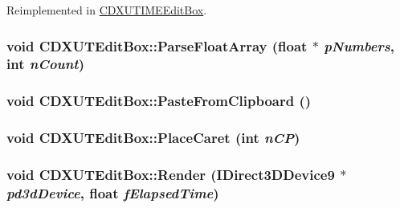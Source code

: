 Reimplemented in \hyperlink{class_c_d_x_u_t_i_m_e_edit_box_a6f3ada4a18eb810420806d5112fd7de6}{CDXUTIMEEditBox}.\hypertarget{class_c_d_x_u_t_edit_box_a7a3810c8c3ee8f44a87451fd0d3ce127}{
\subsubsection[{ParseFloatArray}]{\setlength{\rightskip}{0pt plus 5cm}void CDXUTEditBox::ParseFloatArray (float $\ast$ {\em pNumbers}, \/  {\bf int} {\em nCount})}}
\label{class_c_d_x_u_t_edit_box_a7a3810c8c3ee8f44a87451fd0d3ce127}
\hypertarget{class_c_d_x_u_t_edit_box_ace90835de5f93d652b474f0b6e16ba9b}{
\subsubsection[{PasteFromClipboard}]{\setlength{\rightskip}{0pt plus 5cm}void CDXUTEditBox::PasteFromClipboard ()}}
\label{class_c_d_x_u_t_edit_box_ace90835de5f93d652b474f0b6e16ba9b}
\hypertarget{class_c_d_x_u_t_edit_box_a2719e73a4549625b2f08bacea7abf270}{
\subsubsection[{PlaceCaret}]{\setlength{\rightskip}{0pt plus 5cm}void CDXUTEditBox::PlaceCaret ({\bf int} {\em nCP})}}
\label{class_c_d_x_u_t_edit_box_a2719e73a4549625b2f08bacea7abf270}
\hypertarget{class_c_d_x_u_t_edit_box_af36e6dfc05fb96ee4f60544cc402e760}{
\subsubsection[{Render}]{\setlength{\rightskip}{0pt plus 5cm}void CDXUTEditBox::Render (IDirect3DDevice9 $\ast$ {\em pd3dDevice}, \/  float {\em fElapsedTime})}}
\label{class_c_d_x_u_t_edit_box_af36e6dfc05fb96ee4f60544cc402e760}


